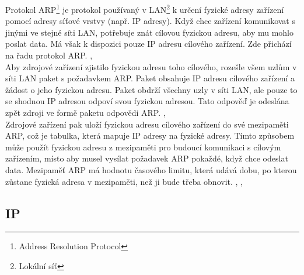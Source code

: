 \documentclass[12pt]{report}			%
\begin{document}
				
Protokol ARP\footnote{Address Resolution Protocol} je protokol používaný v LAN\footnote{Lokální síť} k určení fyzické adresy zařízení pomocí adresy síťové vrstvy (např. IP adresy). Když chce zařízení komunikovat s jinými ve stejné síti LAN, potřebuje znát cílovou fyzickou adresu, aby mu mohlo poslat data. Má však k dispozici pouze IP adresu cílového zařízení. Zde přichází na řadu protokol ARP. \cite{arp3}, \cite{arp1}
\\
Aby zdrojové zařízení zjistilo fyzickou adresu toho cílového, rozešle všem uzlům v síti LAN paket s požadavkem ARP. Paket obsahuje IP adresu cílového zařízení a žádost o jeho fyzickou adresu. Paket obdrží všechny uzly v síti LAN, ale pouze to se shodnou IP adresou odpoví svou fyzickou adresou. Tato odpověď je odeslána zpět zdroji ve formě paketu odpovědi ARP. \cite{arp3}, \cite{arp2}
\\
Zdrojové zařízení pak uloží fyzickou adresu cílového zařízení do své mezipaměti ARP, což je tabulka, která mapuje IP adresy na fyzické adresy. Tímto způsobem může použít fyzickou adresu z mezipaměti pro budoucí komunikaci s cílovým zařízením, místo aby musel vysílat požadavek ARP pokaždé, když chce odeslat data. Mezipaměť ARP má hodnotu časového limitu, která udává dobu, po kterou zůstane fyzická adresa v mezipaměti, než ji bude třeba obnovit. \cite{arp1}, \cite{arp2}, \cite{arp3}

				\subsection{IP}
				
\end{document}
